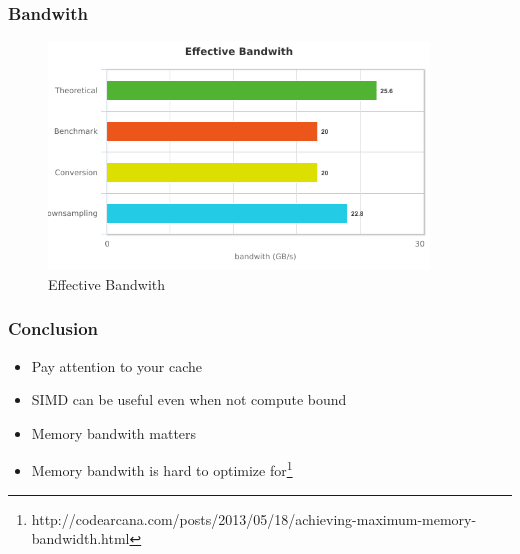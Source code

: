 \documentclass{beamer}
\begin{document}
\begin{frame}
  \frametitle{Bandwith}
  \begin{figure}
  \includegraphics[width=0.9\textwidth]{images/bandwith}
  \caption{Effective Bandwith}
  \end{figure}
\end{frame}

\begin{frame}
  \frametitle{Conclusion}
  \begin{itemize}
    \item{Pay attention to your cache}
    \item{SIMD can be useful even when not compute bound}
    \item{Memory bandwith matters}
    \item{Memory bandwith is hard to optimize for\footnote{http://codearcana.com/posts/2013/05/18/achieving-maximum-memory-bandwidth.html}}
  \end{itemize}
\end{frame}
\end{document}

